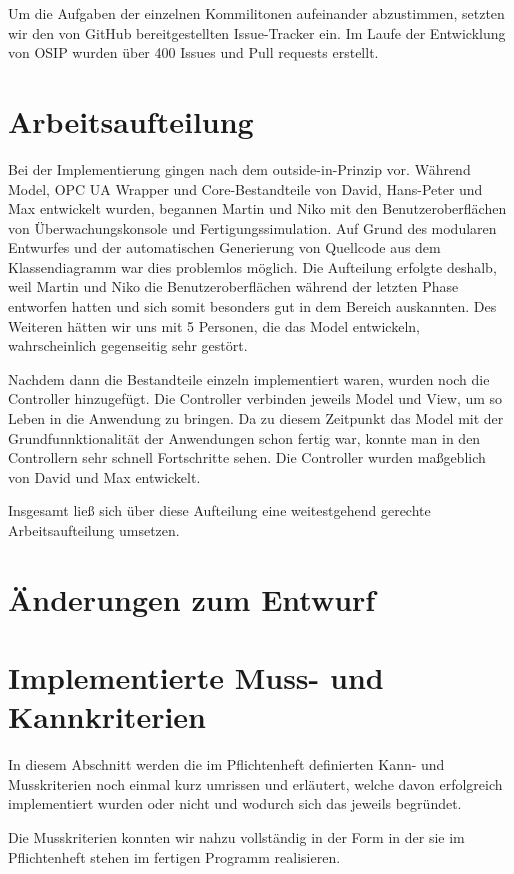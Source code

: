 \documentclass[parskip=full]{scrartcl}
\begin{document}
Um die Aufgaben der einzelnen Kommilitonen aufeinander abzustimmen, setzten wir den von GitHub bereitgestellten Issue-Tracker ein. Im Laufe der
Entwicklung von OSIP wurden über 400 Issues und Pull requests erstellt.

\section{Arbeitsaufteilung}
Bei der Implementierung gingen nach dem outside-in-Prinzip vor. Während Model, OPC UA Wrapper und Core-Bestandteile von David, Hans-Peter und Max entwickelt wurden,
begannen Martin und Niko mit den Benutzeroberflächen von Überwachungskonsole und Fertigungssimulation. Auf Grund des modularen Entwurfes
und der automatischen Generierung von Quellcode aus dem Klassendiagramm war dies problemlos möglich. Die Aufteilung erfolgte deshalb, weil Martin und Niko die
Benutzeroberflächen während der letzten Phase entworfen hatten und sich somit besonders gut in dem Bereich auskannten. Des Weiteren hätten wir uns mit 5 Personen,
die das Model entwickeln, wahrscheinlich gegenseitig sehr gestört.

Nachdem dann die Bestandteile einzeln implementiert waren, wurden noch die Controller hinzugefügt. Die Controller verbinden jeweils Model und View,
um so Leben in die Anwendung zu bringen. Da zu diesem Zeitpunkt das Model mit der Grundfunnktionalität der Anwendungen schon fertig war,
konnte man in den Controllern sehr schnell Fortschritte sehen. Die Controller wurden maßgeblich von David und Max entwickelt.

Insgesamt ließ sich über diese Aufteilung eine weitestgehend gerechte Arbeitsaufteilung umsetzen.

\section{Änderungen zum Entwurf}


\section{Implementierte Muss- und Kannkriterien}
In diesem Abschnitt werden die im Pflichtenheft definierten Kann- und Musskriterien noch einmal kurz umrissen und erläutert, welche davon erfolgreich
implementiert wurden oder nicht und wodurch sich das jeweils begründet.

Die Musskriterien konnten wir nahzu vollständig in der Form in der sie im Pflichtenheft stehen im fertigen Programm realisieren.
\end{document}
